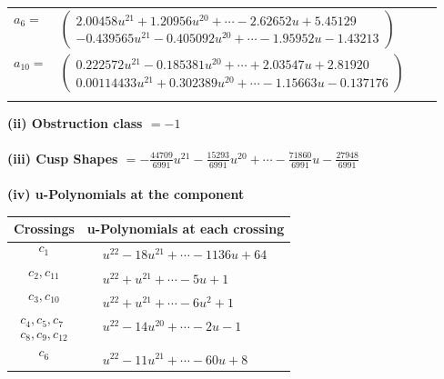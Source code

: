 \documentclass[1p]{elsarticle_modified}
\theoremstyle{definition}
\begin{document}
\begin{tabular}{m{7pt} m{180pt} m{7pt} m{180pt} }
\flushright $a_{6}=$&$\begin{pmatrix}2.00458 u^{21}+1.20956 u^{20}+\cdots-2.62652 u+5.45129\\-0.439565 u^{21}-0.405092 u^{20}+\cdots-1.95952 u-1.43213\end{pmatrix}$ \\
\flushright $a_{10}=$&$\begin{pmatrix}0.222572 u^{21}-0.185381 u^{20}+\cdots+2.03547 u+2.81920\\0.00114433 u^{21}+0.302389 u^{20}+\cdots-1.15663 u-0.137176\end{pmatrix}$\\&\end{tabular}
\flushleft \textbf{(ii) Obstruction class $= -1$}\\~\\
\flushleft \textbf{(iii) Cusp Shapes $= -\frac{44709}{6991} u^{21}-\frac{15293}{6991} u^{20}+\cdots-\frac{71860}{6991} u-\frac{27948}{6991}$}\\~\\
\newpage\renewcommand{\arraystretch}{1}
\flushleft \textbf{(iv) u-Polynomials at the component}\newline \\
\begin{tabular}{m{50pt}|m{274pt}}
Crossings & \hspace{64pt}u-Polynomials at each crossing \\
\hline $$\begin{aligned}c_{1}\end{aligned}$$&$\begin{aligned}
&u^{22}-18 u^{21}+\cdots-1136 u+64
\end{aligned}$\\
\hline $$\begin{aligned}c_{2},c_{11}\end{aligned}$$&$\begin{aligned}
&u^{22}+u^{21}+\cdots-5 u+1
\end{aligned}$\\
\hline $$\begin{aligned}c_{3},c_{10}\end{aligned}$$&$\begin{aligned}
&u^{22}+u^{21}+\cdots-6 u^2+1
\end{aligned}$\\
\hline $$\begin{aligned}c_{4},c_{5},c_{7}\\c_{8},c_{9},c_{12}\end{aligned}$$&$\begin{aligned}
&u^{22}-14 u^{20}+\cdots-2 u-1
\end{aligned}$\\
\hline $$\begin{aligned}c_{6}\end{aligned}$$&$\begin{aligned}
&u^{22}-11 u^{21}+\cdots-60 u+8
\end{aligned}$\\
\hline
\end{tabular}\\~\\
\end{document}
